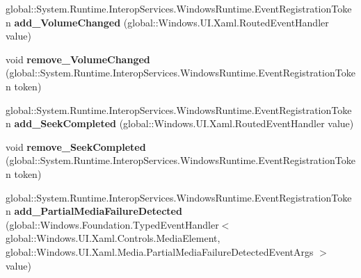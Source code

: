 \begin{DoxyCompactItemize}
\item 
\mbox{\label{class_windows_1_1_u_i_1_1_xaml_1_1_controls_1_1_media_element_a5e1f9d35a52763afdd79bdedc9d0de22}} 
global\+::\+System.\+Runtime.\+Interop\+Services.\+Windows\+Runtime.\+Event\+Registration\+Token {\bfseries add\+\_\+\+Volume\+Changed} (global\+::\+Windows.\+U\+I.\+Xaml.\+Routed\+Event\+Handler value)
\item 
\mbox{\label{class_windows_1_1_u_i_1_1_xaml_1_1_controls_1_1_media_element_a58fbddf945f331a65f79f6c4ade4ed8c}} 
void {\bfseries remove\+\_\+\+Volume\+Changed} (global\+::\+System.\+Runtime.\+Interop\+Services.\+Windows\+Runtime.\+Event\+Registration\+Token token)
\item 
\mbox{\label{class_windows_1_1_u_i_1_1_xaml_1_1_controls_1_1_media_element_a49bafb55130b6c1789858252d474a3e9}} 
global\+::\+System.\+Runtime.\+Interop\+Services.\+Windows\+Runtime.\+Event\+Registration\+Token {\bfseries add\+\_\+\+Seek\+Completed} (global\+::\+Windows.\+U\+I.\+Xaml.\+Routed\+Event\+Handler value)
\item 
\mbox{\label{class_windows_1_1_u_i_1_1_xaml_1_1_controls_1_1_media_element_af16697e133d75536db3069f6faf2947b}} 
void {\bfseries remove\+\_\+\+Seek\+Completed} (global\+::\+System.\+Runtime.\+Interop\+Services.\+Windows\+Runtime.\+Event\+Registration\+Token token)
\item 
\mbox{\label{class_windows_1_1_u_i_1_1_xaml_1_1_controls_1_1_media_element_a400ae0b28bde4d8c18c9e3d927836d0a}} 
global\+::\+System.\+Runtime.\+Interop\+Services.\+Windows\+Runtime.\+Event\+Registration\+Token {\bfseries add\+\_\+\+Partial\+Media\+Failure\+Detected} (global\+::\+Windows.\+Foundation.\+Typed\+Event\+Handler$<$ global\+::\+Windows.\+U\+I.\+Xaml.\+Controls.\+Media\+Element, global\+::\+Windows.\+U\+I.\+Xaml.\+Media.\+Partial\+Media\+Failure\+Detected\+Event\+Args $>$ value)
\item 
\mbox{\label{class_windows_1_1_u_i_1_1_xaml_1_1_controls_1_1_media_element_a81a3770e7e088733e18c03ee7742f336}} 

\end{DoxyCompactItemize}
